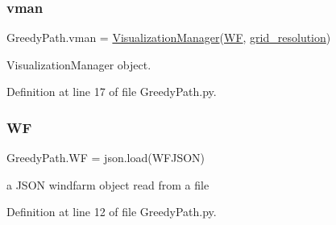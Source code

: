 \subsubsection{\texorpdfstring{vman}{vman}}
{\footnotesize\ttfamily Greedy\+Path.\+vman = \mbox{\hyperlink{classvisualization__manager___d_j_1_1_visualization_manager}{Visualization\+Manager}}(\mbox{\hyperlink{namespace_greedy_path_a23138d42757308a7b4324002f60d751a}{WF}}, \mbox{\hyperlink{namespace_greedy_path_a1d2a41e131ea92ec827544055660645d}{grid\+\_\+resolution}})}



Visualization\+Manager object. 



Definition at line 17 of file Greedy\+Path.\+py.

\mbox{\label{namespace_greedy_path_a23138d42757308a7b4324002f60d751a}} 
\subsubsection{\texorpdfstring{WF}{WF}}
{\footnotesize\ttfamily Greedy\+Path.\+WF = json.\+load(W\+F\+J\+S\+ON)}



a J\+S\+ON windfarm object read from a file 



Definition at line 12 of file Greedy\+Path.\+py.

